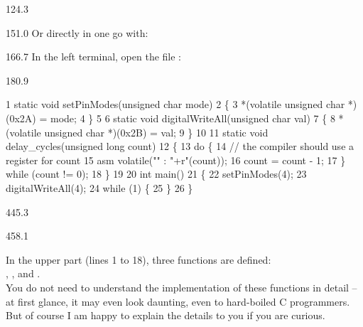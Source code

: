 \documentclass{aslab}
\makeatletter
\newcommand*\aN[1]{\textcolor{codeorange}{#1}}%
\newcommand*\aI[1]{\textcolor{codegreen}{#1}}%
\newcommand*\aK[1]{\textcolor{codered}{#1}}%
\newcommand*\aC[1]{\textcolor{codepurple}{#1}}%
\newenvironment{asmlisting}[1][11]{\par
  \edef\asm@bs{\the\baselineskip}\fontsize{#1bp}{\asm@bs}\selectfont
  \ttfamily\asm@setup}{\par}
\makeatother
\begin{document}
\begin{region}[pitch=13.2]{124.3}
\\
\end{region}

\begin{region}{151.0}
Or directly in one go with: 
\end{region}

\begin{region}{166.7}
In the left terminal, open the file :
\end{region}

\begin{region}[pitch=10]{180.9}
\begin{asmlisting}[9]
  \aN{1} \aI{static} \aI{void} setPinModes(\aI{unsigned} \aI{char} mode)
  \aN{2} \{
  \aN{3}     *(\aI{volatile} \aI{unsigned} \aI{char} *)(\aK{0x2A}) = mode;
  \aN{4} \}
  \aN{5}
  \aN{6} \aI{static} \aI{void} digitalWriteAll(\aI{unsigned} \aI{char} val)
  \aN{7} \{
  \aN{8}     *(\aI{volatile} \aI{unsigned} \aI{char} *)(\aK{0x2B}) = val;
  \aN{9} \}
 \aN{10}
 \aN{11} \aI{static} \aI{void} delay\_cycles(\aI{unsigned} \aI{long} count)
 \aN{12} \{
 \aN{13}     \aN{do} \{
 \aN{14}         \aC{// the compiler should use a register for count}
 \aN{15}         \aN{asm} \aI{volatile}(\aK{""} : \aK{"+r"}(count));
 \aN{16}         count = count - \aK{1};
 \aN{17}     \} \aN{while} (count != \aK{0});
 \aN{18} \}
 \aN{19}
 \aN{20} \aI{int} main()
 \aN{21} \{
 \aN{22}     setPinModes(\aK{4});
 \aN{23}     digitalWriteAll(\aK{4});
 \aN{24}     while (\aK{1}) \{
 \aN{25}     \}
 \aN{26} \}
\end{asmlisting}
\end{region}

\begin{region}{445.3}
\end{region}

\begin{region}[pitch=13.37]{458.1}
\begin{dashlist}
\item In the upper part (lines 1 to 18), three functions are defined:\\
  , , and .\\
  You do not need to understand the implementation of these functions in
  detail -- at first glance, it may even look daunting, even to
  hard-boiled C programmers. But of course I am happy to explain the
  details to you if you are curious.
\end{dashlist}
\end{region}
\end{document}

